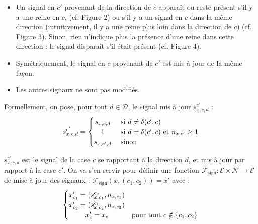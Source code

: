 \documentclass[11pt, openany]{article}
\newcommand{\Ne}{\mathcal{N}}
\newcommand{\D}{\mathcal{D}}
\newcommand{\E}{\mathcal{E}}
\begin{document}
 \begin{itemize} 

\item{%
Un signal en $c'$ provenant de la direction de $c$ apparaît ou reste présent s'il y a une reine en $c$, (cf. Figure $2$) ou s'il y a un signal en $c$ dans la même direction (intuitivement, il y a une reine plus loin dans la direction de $c$) (cf. Figure $3$). Sinon, rien n'indique plus la présence d'une reine dans cette direction : le signal disparaît s'il était présent (cf. Figure $4$). }

\item{ Symétriquement, le signal en $c$ provenant de $c'$ est mis à jour de la même façon.}

\item{ Les autres signaux ne sont pas modifiés. }
  


\end{itemize}

\bigskip

\noindent 
Formellement, on pose, pour tout %
$d\in\D$, le signal mis à jour $s_{x, c, d}^{c'}$ :  \[
s_{x, c, d}^{c'} = 
\begin{cases}
  \hfill s_{x, c, d} \hfill & \text{ si $d \neq \delta(c', c)$} \\
  \hfill 1 \hfill & \text{ si $d = \delta(c', c)$ et $n_{x, c'}\geq 1$} \\
  \hfill s_{x, c', d} \hfill & \text{ sinon}\\
\end{cases}
\]

$s_{x, c, d}^{c'}$ est le signal de la case $c$ se rapportant à la direction $d$, et mis à jour par rapport à la case $c'$. On va s'en servir pour définir une fonction $\mathcal{F}_{\mathrm{sign}} : \E\times\Ne\to\E$ de mise à jour des signaux :
\noindent
 $\mathcal{F}_{\mathrm{sign}} (x, (c_1, c_2)) = x'$ avec : \[
\begin{cases}
  \hfill x'_{c_1} = (s_{x, c_1}^{c_2}, n_{x,c_1}) \hfill & \\
  \hfill x'_{c_2} = (s_{x, c_2}^{c_1}, n_{x, c_2}) \hfill & \\
  \hfill x'_c = x_c  \hfill & \text{pour tout $c \notin \{ c_1, c_2\}$} \\
\end{cases}
\]
\end{document}
